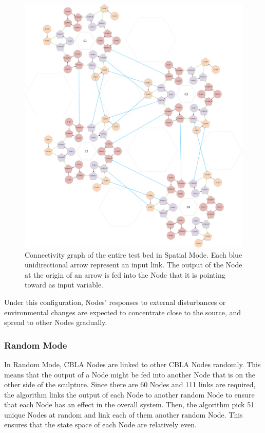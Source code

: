 \begin{figure} [!htbp]
	\centering
	\includegraphics[height=0.85 \textheight]{"fig/validations/Spatial Global Mode"}
	\caption[Connectivity graph of the entire test bed in Spatial Mode]{Connectivity graph of the entire test bed in Spatial Mode. Each blue unidirectional arrow represent an input link. The output of the Node at the origin of an arrow is fed into the Node that it is pointing toward as input variable.}
	\label{fig:Spatial Global Mode}
\end{figure}

Under this configuration, Nodes' responses to external disturbances or environmental changes are expected to concentrate close to the source, and spread to other Nodes gradually. 

\subsubsection{Random Mode}

In Random Mode, CBLA Nodes are linked to other CBLA Nodes randomly. This means that the output of a Node might be fed into another Node that is on the other side of the sculpture. Since there are 60 Nodes and 111 links are required, the algorithm links the output of each Node to another random Node to ensure that each Node has an effect in the overall system. Then, the algorithm pick 51 unique Nodes at random and link each of them another random Node. This ensures that the state space of each Node are relatively even. 

